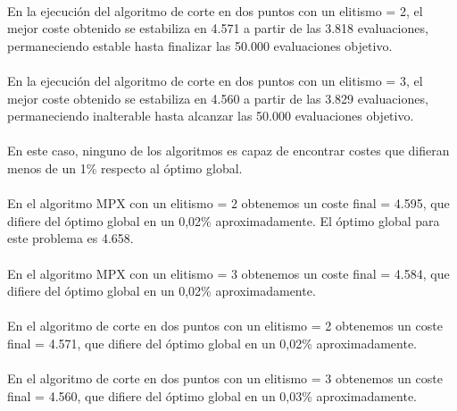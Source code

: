 	\paragraph{}En la ejecución del algoritmo de corte en dos puntos con un elitismo = 2, el mejor coste obtenido se estabiliza en 4.571 a partir de las 3.818 evaluaciones, permaneciendo estable hasta finalizar las 50.000 evaluaciones objetivo.
	
	\paragraph{}En la ejecución del algoritmo de corte en dos puntos con un elitismo = 3, el mejor coste obtenido se estabiliza en 4.560 a partir de las 3.829 evaluaciones, permaneciendo inalterable hasta alcanzar las 50.000 evaluaciones objetivo.
	
	\paragraph{}En este caso, ninguno de los algoritmos es capaz de encontrar costes que difieran menos de un 1\% respecto al óptimo global.
	
	\paragraph{}En el algoritmo MPX con un elitismo = 2 obtenemos un coste final = 4.595, que difiere del óptimo global en un 0,02\% aproximadamente. El óptimo global para este problema es 4.658.
	
	\paragraph{}En el algoritmo MPX con un elitismo = 3 obtenemos un coste final = 4.584, que difiere del óptimo global en un 0,02\% aproximadamente.
	
	\paragraph{}En el algoritmo de corte en dos puntos con un elitismo = 2 obtenemos un coste final = 4.571, que difiere del óptimo global en un 0,02\% aproximadamente.
	
	\paragraph{}En el algoritmo de corte en dos puntos con un elitismo = 3 obtenemos un coste final = 4.560, que difiere del óptimo global en un 0,03\% aproximadamente.

